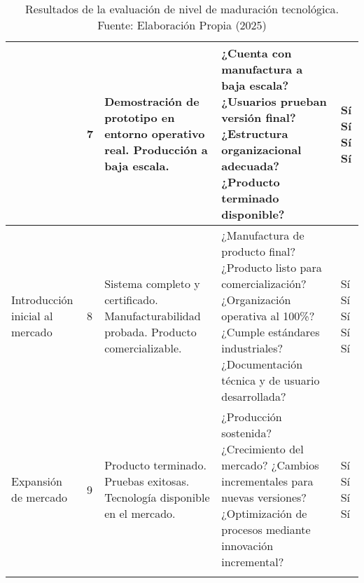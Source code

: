 \begin{longtable}{|p{2.5cm}|p{0.5cm}|p{4cm}|p{4cm}|p{1cm}|}
& 7 &
Demostración de prototipo en entorno operativo real. Producción a baja escala. &
¿Cuenta con manufactura a baja escala? \newline
¿Usuarios prueban versión final? \newline
¿Estructura organizacional adecuada? \newline
¿Producto terminado disponible? &
Sí \newline Sí \newline Sí \newline Sí \\
\hline

Introducción inicial al mercado & 8 &
Sistema completo y certificado. Manufacturabilidad probada. Producto comercializable. &
¿Manufactura de producto final? \newline
¿Producto listo para comercialización? \newline
¿Organización operativa al 100\%? \newline
¿Cumple estándares industriales? \newline
¿Documentación técnica y de usuario desarrollada? &
Sí \newline Sí \newline Sí \newline Sí \newline Sí \\
\hline

Expansión de mercado & 9 &
Producto terminado. Pruebas exitosas. Tecnología disponible en el mercado. &
¿Producción sostenida? \newline
¿Crecimiento del mercado? \newline
¿Cambios incrementales para nuevas versiones? \newline
¿Optimización de procesos mediante innovación incremental? &
Sí \newline Sí \newline Sí \newline Sí \\
\hline
\caption{Resultados de la evaluación de nivel de maduración tecnológica. Fuente: Elaboración Propia (2025)}
\label{m20}
\end{longtable}

